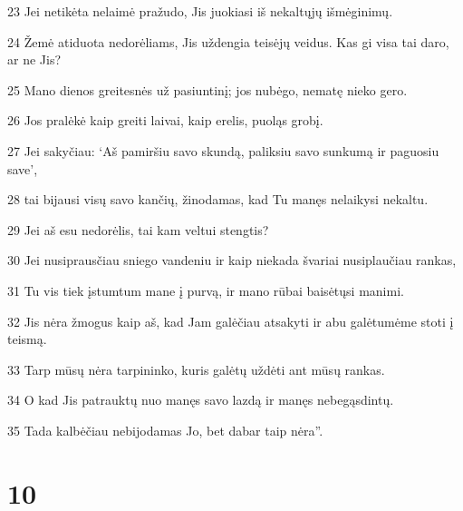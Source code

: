 \par 23 Jei netikėta nelaimė pražudo, Jis juokiasi iš nekaltųjų išmėginimų. 
\par 24 Žemė atiduota nedorėliams, Jis uždengia teisėjų veidus. Kas gi visa tai daro, ar ne Jis? 
\par 25 Mano dienos greitesnės už pasiuntinį; jos nubėgo, nematę nieko gero. 
\par 26 Jos pralėkė kaip greiti laivai, kaip erelis, puoląs grobį. 
\par 27 Jei sakyčiau: ‘Aš pamiršiu savo skundą, paliksiu savo sunkumą ir paguosiu save’, 
\par 28 tai bijausi visų savo kančių, žinodamas, kad Tu manęs nelaikysi nekaltu. 
\par 29 Jei aš esu nedorėlis, tai kam veltui stengtis? 
\par 30 Jei nusiprausčiau sniego vandeniu ir kaip niekada švariai nusiplaučiau rankas, 
\par 31 Tu vis tiek įstumtum mane į purvą, ir mano rūbai baisėtųsi manimi. 
\par 32 Jis nėra žmogus kaip aš, kad Jam galėčiau atsakyti ir abu galėtumėme stoti į teismą. 
\par 33 Tarp mūsų nėra tarpininko, kuris galėtų uždėti ant mūsų rankas. 
\par 34 O kad Jis patrauktų nuo manęs savo lazdą ir manęs nebegąsdintų. 
\par 35 Tada kalbėčiau nebijodamas Jo, bet dabar taip nėra”.



\chapter{10}



